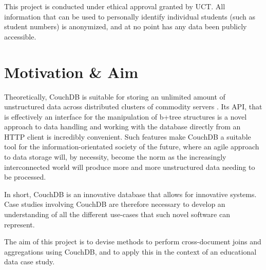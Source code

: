 This project is conducted under ethical approval granted by UCT. All information that can be used to personally identify individual students (such as student numbers) is anonymized, and at no point has any data been publicly accessible.

\section{Motivation \& Aim}
Theoretically, CouchDB is suitable for storing an unlimited amount of unstructured data across distributed clusters of commodity servers \cite{couchdb2.0}. Its API, that is effectively an interface for the manipulation of b+tree structures is a novel approach to data handling and working with the database directly from an HTTP client is incredibly convenient. Such features make CouchDB a suitable tool for the information-orientated society of the future, where an agile approach to data storage will, by necessity, become the norm as the increasingly interconnected world will produce more and more unstructured data needing to be processed.

In short, CouchDB is an innovative database that allows for innovative systems. Case studies involving CouchDB are therefore necessary to develop an understanding of all the different use-cases that such novel software can represent.

The aim of this project is to devise methods to perform cross-document joins and aggregations using CouchDB, and to apply this in the context of an educational data case study.